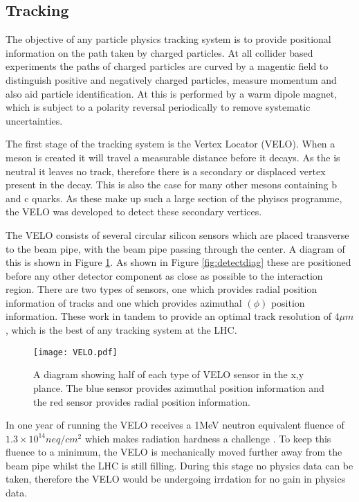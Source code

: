 \subsection{Tracking}
\label{sec:Tracking}
The objective of any particle physics tracking system is to provide positional information on the path taken by charged particles.  At all collider based experiments the paths of charged particles are curved by a magentic field to distinguish positive and negatively charged particles, measure momentum and also aid particle identification.  At \lhcb this is performed by a warm dipole magnet, which is subject to a polarity reversal periodically to remove systematic uncertainties.

The first stage of the \lhcb tracking system is the Vertex Locator (VELO).  When a \Bd meson is created it will travel a measurable distance before it decays.  As the \Bd is neutral it leaves no track, therefore there is a secondary or displaced vertex present in the decay.  This is also the case for many other mesons containing b and c quarks.  As these make up such a large section of the \lhcb phyiscs programme, the VELO was developed to detect these secondary vertices.

The VELO consists of several circular silicon sensors which are placed transverse to the beam pipe, with the beam pipe passing through the center.  A diagram of this is shown in Figure \ref{fig:VELO}.  As shown in Figure \ref{fig:detectdiag} these are positioned before any other detector component as close as possible to the interaction region.  There are two types of sensors, one which provides radial position information of tracks and one which provides azimuthal $(\phi)$ position information.  These work in tandem to provide an optimal track resolution of $4\mu m$ \cite{Aaij:1978280}, which is the best of any tracking system at the LHC.
\begin{figure}
  \centering
  \texttt{[image: VELO.pdf]}
  \caption{A diagram showing half of each type of VELO sensor in the x,y plance.  The blue sensor provides azimuthal position information and the red sensor provides radial position information.}
  \label{fig:VELO}
\end{figure}

 In one year of running the VELO receives a 1MeV neutron equivalent fluence of $1.3\times10^{14} neq/cm^2$ which makes radiation hardness a challenge \cite{Alves:1129809}.  To keep this fluence to a minimum, the VELO is mechanically moved further away from the beam pipe whilst the LHC is still filling.  During this stage no physics data can be taken, therefore the VELO would be undergoing irrdation for no gain in physics data.

